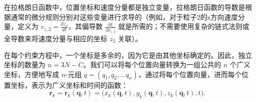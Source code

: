 在拉格朗日函数中，位置坐标和速度分量都是独立变量，拉格朗日函数的导数是根据通常的微分规则分别对这些变量进行求导的（例如，对于粒子2的z方向速度分量，定义为 \(v_{z,2} = \frac{dz_2}{dt}\)，其偏导数 \(\frac{\partial L}{\partial v_{z,2}}\) 就是所需的；不需要使用复杂的链式法则或全导数来将速度分量与相应的坐标 \(z_2\) 关联）。

在每个约束方程中，一个坐标是多余的，因为它是由其他坐标确定的。因此，独立坐标的数量为 \(n = 3N - C\)。我们可以将每个位置向量转换为一组公共的 \(n\) 个广义坐标，方便地写成 \(n\)-元组 \(q = (q_1, q_2, ... q_n)\)，通过将每个位置向量，进而每个位置坐标，表示为广义坐标和时间的函数：
\[
\mathbf{r}_{k} = \mathbf{r}_{k}(\mathbf{q}, t) = {\big (}x_{k}(\mathbf{q}, t), y_{k}(\mathbf{q}, t), z_{k}(\mathbf{q}, t), t{\big )}.~
\]